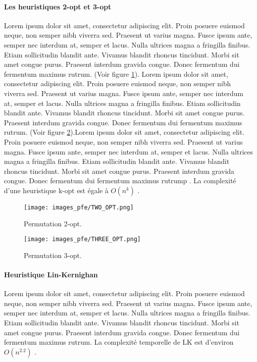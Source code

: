 \paragraph{Les heuristiques 2-opt et 3-opt}
Lorem ipsum dolor sit amet, consectetur adipiscing elit. Proin posuere euismod neque, non semper nibh viverra sed. Praesent ut varius magna. Fusce ipsum ante, semper nec interdum at, semper et lacus. Nulla ultrices magna a fringilla finibus. Etiam sollicitudin blandit ante. Vivamus blandit rhoncus tincidunt. Morbi sit amet congue purus. Praesent interdum gravida congue. Donec fermentum dui fermentum maximus rutrum. (Voir figure \ref{fig:two-opt}). Lorem ipsum dolor sit amet, consectetur adipiscing elit. Proin posuere euismod neque, non semper nibh viverra sed. Praesent ut varius magna. Fusce ipsum ante, semper nec interdum at, semper et lacus. Nulla ultrices magna a fringilla finibus. Etiam sollicitudin blandit ante. Vivamus blandit rhoncus tincidunt. Morbi sit amet congue purus. Praesent interdum gravida congue. Donec fermentum dui fermentum maximus rutrum. (Voir figure \ref{fig:three-opt}).Lorem ipsum dolor sit amet, consectetur adipiscing elit. Proin posuere euismod neque, non semper nibh viverra sed. Praesent ut varius magna. Fusce ipsum ante, semper nec interdum at, semper et lacus. Nulla ultrices magna a fringilla finibus. Etiam sollicitudin blandit ante. Vivamus blandit rhoncus tincidunt. Morbi sit amet congue purus. Praesent interdum gravida congue. Donec fermentum dui fermentum maximus rutrump \parencite{davendra_traveling_2010}. La complexité d'une heuristique k-opt est égale à $O(n^k)$ \parencite{golden_approximate_1980}.

\begin{figure}[hbt!]
  \centering
  \texttt{[image: images\_pfe/TWO\_OPT.png]}
  \caption{Permutation 2-opt.}
  \label{fig:two-opt}
\end{figure}
\FloatBarrier

\begin{figure}[hbt!]
  \centering
  \texttt{[image: images\_pfe/THREE\_OPT.png]}
  \caption{Permutation 3-opt.}
  \label{fig:three-opt}
\end{figure}
\FloatBarrier

\medskip

\paragraph{Heuristique Lin-Kernighan}
\label{par:lin-kernighan}
Lorem ipsum dolor sit amet, consectetur adipiscing elit. Proin posuere euismod neque, non semper nibh viverra sed. Praesent ut varius magna. Fusce ipsum ante, semper nec interdum at, semper et lacus. Nulla ultrices magna a fringilla finibus. Etiam sollicitudin blandit ante. Vivamus blandit rhoncus tincidunt. Morbi sit amet congue purus. Praesent interdum gravida congue. Donec fermentum dui fermentum maximus rutrum. La complexité temporelle de LK est d'environ $O(n^{2.2})$ \parencite{helsgaun_effective_2000}.

